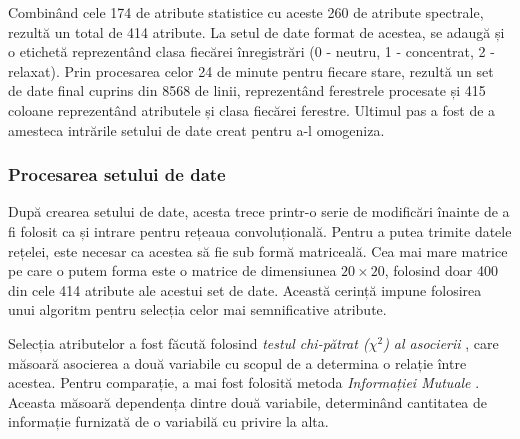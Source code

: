 Combinând cele 174 de atribute statistice cu aceste 260 de atribute spectrale, rezultă un total de 414 atribute. La setul de date format de acestea, se adaugă și o etichetă reprezentând clasa fiecărei înregistrări (0 - neutru, 1 - concentrat, 2 - relaxat). Prin procesarea celor 24 de minute pentru fiecare stare, rezultă un set de date final cuprins din 8568 de linii, reprezentând ferestrele procesate și 415 coloane reprezentând atributele și clasa fiecărei ferestre. Ultimul pas a fost de a amesteca intrările setului de date creat pentru a-l omogeniza.

\subsubsection*{Procesarea setului de date}\label{ssch:procesare-date}
După crearea setului de date, acesta trece printr-o serie de modificări înainte de a fi folosit ca și intrare pentru rețeaua convoluțională. Pentru a putea trimite datele rețelei, este necesar ca acestea să fie sub formă matriceală. Cea mai mare matrice pe care o putem forma este o matrice de dimensiunea $20\times20$, folosind doar 400 din cele 414 atribute ale acestui set de date. Această cerință impune folosirea unui algoritm pentru selecția celor mai semnificative atribute.

Selecția atributelor a fost făcută folosind \textit{testul chi-pătrat ($\chi^2$) al asocierii} \cite{online:chi-squared-pdf}, care măsoară asocierea a două variabile cu scopul de a determina o relație între acestea. Pentru comparație, a mai fost folosită metoda \textit{Informației Mutuale} \cite{online:info-mutuala}. Aceasta măsoară dependența dintre două variabile, determinând cantitatea de informație furnizată de o variabilă cu privire la alta.

